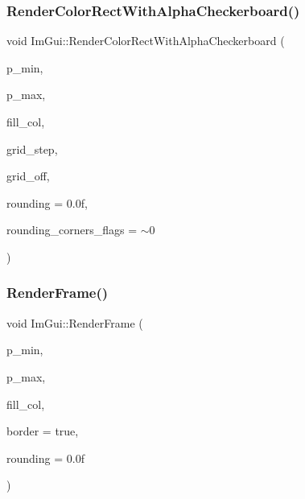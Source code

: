 \subsubsection{\texorpdfstring{Render\+Color\+Rect\+With\+Alpha\+Checkerboard()}{RenderColorRectWithAlphaCheckerboard()}}
{\footnotesize\ttfamily void Im\+Gui\+::\+Render\+Color\+Rect\+With\+Alpha\+Checkerboard (\begin{DoxyParamCaption}\item[{\mbox{\hyperlink{struct_im_vec2}{Im\+Vec2}}}]{p\+\_\+min,  }\item[{\mbox{\hyperlink{struct_im_vec2}{Im\+Vec2}}}]{p\+\_\+max,  }\item[{\mbox{\hyperlink{imgui_8h_a118cff4eeb8d00e7d07ce3d6460eed36}{Im\+U32}}}]{fill\+\_\+col,  }\item[{float}]{grid\+\_\+step,  }\item[{\mbox{\hyperlink{struct_im_vec2}{Im\+Vec2}}}]{grid\+\_\+off,  }\item[{float}]{rounding = {\ttfamily 0.0f},  }\item[{int}]{rounding\+\_\+corners\+\_\+flags = {\ttfamily $\sim$0} }\end{DoxyParamCaption})}

\mbox{\label{namespace_im_gui_a621ba649568ede3939d4f10d83b86d04}} 
\subsubsection{\texorpdfstring{Render\+Frame()}{RenderFrame()}}
{\footnotesize\ttfamily void Im\+Gui\+::\+Render\+Frame (\begin{DoxyParamCaption}\item[{\mbox{\hyperlink{struct_im_vec2}{Im\+Vec2}}}]{p\+\_\+min,  }\item[{\mbox{\hyperlink{struct_im_vec2}{Im\+Vec2}}}]{p\+\_\+max,  }\item[{\mbox{\hyperlink{imgui_8h_a118cff4eeb8d00e7d07ce3d6460eed36}{Im\+U32}}}]{fill\+\_\+col,  }\item[{bool}]{border = {\ttfamily true},  }\item[{float}]{rounding = {\ttfamily 0.0f} }\end{DoxyParamCaption})}

\mbox{\label{namespace_im_gui_adc76239c2006e66f8dab7638529a763d}} 
